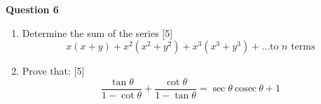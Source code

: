 \noindent
\textbf{Question 6}
\begin{enumerate}[label=(\roman*)]

    \item Determine the sum of the series \hfill [5]
        \[
            x(x+y) + x^2(x^2 + y^2) + x^3(x^3 + y^3) + \dots \text{to $n$ terms}
        \]

    \item Prove that: \hfill [5]
        \[
            \frac{\tan \theta}{1 - \cot \theta} + 
            \frac{\cot \theta}{1 - \tan \theta} = 
            \sec \theta \ \mathrm{cosec} \ \theta + 1
        \]

\end{enumerate}


